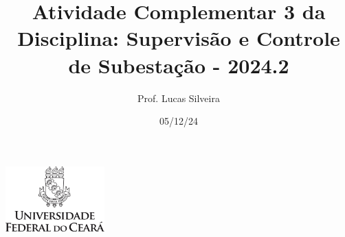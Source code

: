 \documentclass[12pt]{article}
\title{Atividade Complementar 3 da Disciplina: Supervisão e Controle de Subestação - 2024.2}
\author{Prof. Lucas Silveira}
\date{05/12/24}
\begin{document}
{
  \centering
  \vspace{-0.4in}
  \includegraphics[width=1.5in]{Figuras/brasao-ufc-mono.png}
  \vspace{-0.2in}
  {\let\newpage\relax\maketitle}
}


\end{document}
